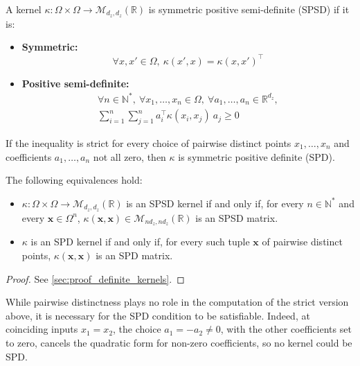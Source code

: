 \begin{definition}\label{th:kernel_SPSD}
	A kernel $\kappa:\Omega\times\Omega\to\mathcal{M}_{d_z,d_z}(\mathbb{R})$ is symmetric positive semi-definite (SPSD) if it is:
	\begin{itemize}
		\item\textbf{Symmetric:}
		\begin{equation}
			\forall x,x'\in\Omega,\:\kappa(x',x)=\kappa(x,x')^\top
		\end{equation}
		\item\textbf{Positive semi-definite:}
		\begin{equation}
			\begin{gathered}
			\forall n\in\mathbb{N}^*,\:\forall x_1,\dots,x_n\in\Omega,\:\forall a_1,\dots,a_n\in\mathbb{R}^{d_z},\\
			\sum_{i=1}^n\sum_{j=1}^na_i^\top \kappa(x_i,x_j)\:a_j\geq0
			\end{gathered}
		\end{equation}
	\end{itemize}

	If the inequality is strict for every choice of pairwise distinct points $x_1,\dots,x_n$ and coefficients $a_1,\dots,a_n$ not all zero, then $\kappa$ is symmetric positive definite (SPD).
\end{definition}

\begin{proposition}\label{th:kernel_gram_equivalence}
	The following equivalences hold:
	\begin{itemize}
		\item $\kappa:\Omega\times\Omega\to\mathcal{M}_{d_z,d_z}(\mathbb{R})$ is an SPSD kernel if and only if, for every $n\in\mathbb{N}^*$ and every $\mathbf{x}\in\Omega^n$, $\kappa(\mathbf{x},\mathbf{x})\in\mathcal{M}_{nd_z,nd_z}(\mathbb{R})$ is an SPSD matrix.
		\item $\kappa$ is an SPD kernel if and only if, for every such tuple $\mathbf{x}$ of pairwise distinct points, $\kappa(\mathbf{x},\mathbf{x})$ is an SPD matrix.
	\end{itemize}
\end{proposition}

\begin{proof}
	See \cref{sec:proof_definite_kernels}.
\end{proof}

\begin{remark}
	While pairwise distinctness plays no role in the computation of the strict version above, it is necessary for the SPD condition to be satisfiable. Indeed, at coinciding inputs $x_1=x_2$, the choice $a_1=-a_2\neq0$, with the other coefficients set to zero, cancels the quadratic form for non-zero coefficients, so no kernel could be SPD.
\end{remark}

